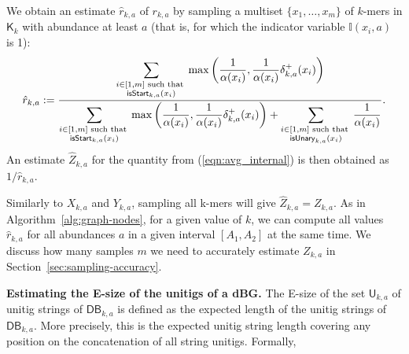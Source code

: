 \documentclass[a4paper,11pt]{article}
\newcommand{\DB}{\mathsf{DB}_{k,a}}
\newcommand{\U}{\mathsf{U}_{k,a}}
\newcommand{\dplus}{\delta^+_{k,a}}
\newcommand{\K}{\mathsf{K}}
\newcommand{\abu}{\alpha}
\newcommand{\isstart}{{\sf isStart}_{k,a}}
\newcommand{\isunary}{{\sf isUnary}_{k,a}}
\begin{document}
We obtain an estimate $\hat{r}_{k,a}$ of $r_{k,a}$ by sampling a multiset $\{x_1,\dots,x_m\}$ of $k$-mers in $\K_k$ with abundance at least $a$ (that is, for which the indicator variable $\mathbb{I}(x_i,a)$ is 1):
\[\hat{r}_{k,a} := \frac{\displaystyle\sum_{\begin{subarray}{c} i \in [1,m] \text{ such that } \\ \isstart(x_i) \end{subarray}} \max\left(\frac{1}{\abu(x_i)},\frac{1}{\abu(x_i)}\dplus(x_i)\right)}{\displaystyle \sum_{\begin{subarray}{c} i \in [1,m] \text{ such that } \\ \isstart(x_i) \end{subarray}} \max\left(\frac{1}{\abu(x_i)},\frac{1}{\abu(x_i)}\dplus(x_i)\right) + \sum_{\begin{subarray}{c} i \in [1,m] \text{ such that } \\ \isunary(x_i) \end{subarray}} \frac{1}{\abu(x_i)}}.\]
An estimate $\hat{Z}_{k,a}$ for the quantity from (\ref{eqn:avg_internal}) is then obtained as $1/\hat{r}_{k,a}$. 

Similarly to $X_{k,a}$ and $Y_{k,a}$, sampling all k-mers will give $\hat{Z}_{k,a} = Z_{k,a}$. As in Algorithm~\ref{alg:graph-nodes}, for a given value of $k$, we can compute all values $\hat{r}_{k,a}$ for all abundances $a$ in a given interval $[A_1,A_2]$ at the same time. We discuss how many samples $m$ we need to accurately estimate $Z_{k,a}$ in Section~\ref{sec:sampling-accuracy}.



\medskip
\noindent\textbf{Estimating the E-size of the unitigs of a dBG.} The E-size \cite{Salzberg2011} of the set $\U$ of unitig strings of $\DB$ is defined as the expected length of the unitig strings of $\DB$. More precisely, this is the expected unitig string length covering any position on the concatenation of all string unitigs. Formally, 
\end{document}
